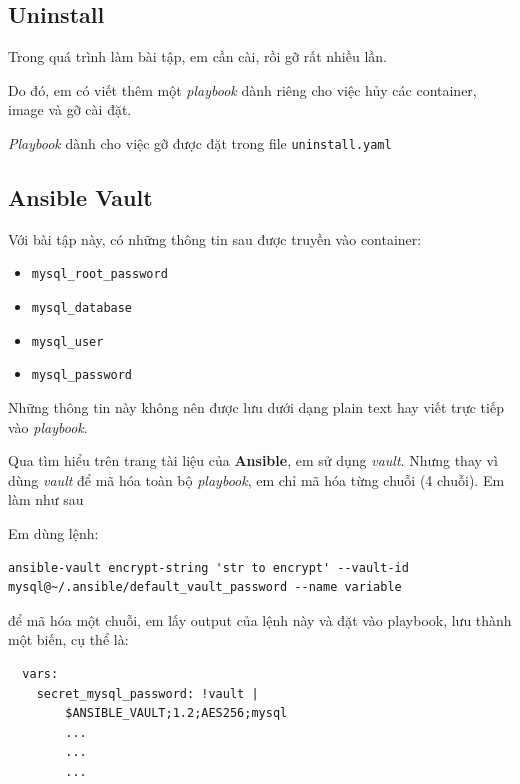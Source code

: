 \documentclass{article}
\begin{document}
\subsection{Uninstall}

\par Trong quá trình làm bài tập, em cần cài, rồi gỡ rất nhiều lần.

\par Do đó, em có viết thêm một \textit{playbook} dành riêng cho việc hủy các container, image và gỡ cài đặt.

\par \textit{Playbook} dành cho việc gỡ được đặt trong file \texttt{uninstall.yaml}


\subsection{Ansible Vault}

\par Với bài tập này, có những thông tin sau được truyền vào container:

\begin{itemize}
    \item \texttt{mysql\_root\_password}
    \item \texttt{mysql\_database}
    \item \texttt{mysql\_user}
    \item \texttt{mysql\_password}
\end{itemize}

\par Những thông tin này không nên được lưu dưới dạng plain text hay viết trực tiếp vào \textit{playbook}.

\par Qua tìm hiểu trên trang tài liệu của \textbf{Ansible}, em sử dụng \textit{vault}. Nhưng thay vì dùng \textit{vault} để mã hóa toàn bộ \textit{playbook}, em chỉ mã hóa từng chuỗi (4 chuỗi). Em làm như sau

\par Em dùng lệnh:

\begin{verbatim}
ansible-vault encrypt-string 'str to encrypt' --vault-id mysql@~/.ansible/default_vault_password --name variable
\end{verbatim}
\par để mã hóa một chuỗi, em lấy output của lệnh này và đặt vào playbook, lưu thành một biến, cụ thể là:

\begin{verbatim}
  vars:
    secret_mysql_password: !vault |
        $ANSIBLE_VAULT;1.2;AES256;mysql
        ...
        ...
        ...
\end{verbatim}
\end{document}
